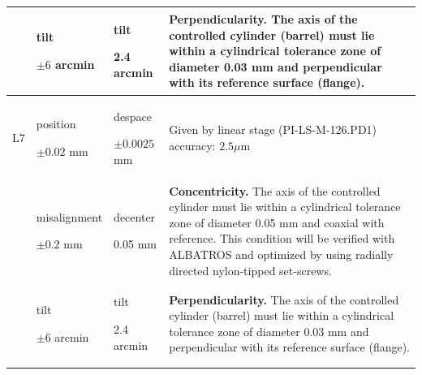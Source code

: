 \documentclass{report}
\begin{document}
\begin{table}
\begin{center}
\begin{tabular}{lp{2cm}p{2cm}p{7cm}}
&tilt\par$\pm6$ arcmin&tilt\par 2.4 arcmin & \textbf{Perpendicularity.} The axis of the controlled cylinder (barrel) must lie within a cylindrical tolerance zone of diameter 0.03 mm and perpendicular with its reference surface (flange).\\
\hline
L7
&position\par$\pm0.02$ mm&despace\par$\pm 0.0025$ mm&
Given by linear stage (PI-LS-M-126.PD1) accuracy: $2.5\mu$m\\
&misalignment\par$\pm0.2$ mm&decenter\par 0.05 mm&
\textbf{Concentricity.} The axis of the controlled cylinder must lie within a cylindrical tolerance zone of diameter 0.05 mm and coaxial with reference.
This condition will be verified with ALBATROS and optimized by using radially directed nylon-tipped set-screws.\\
&tilt\par$\pm6$ arcmin&tilt\par 2.4 arcmin &
\textbf{Perpendicularity.} The axis of the controlled cylinder (barrel) must lie within a cylindrical tolerance zone of diameter 0.03 mm and perpendicular with its reference surface (flange).\\
\hline
\end{tabular}
\end{center}
\end{table}
\end{document}
